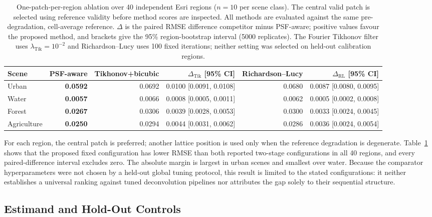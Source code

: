 \documentclass[journal]{IEEEtran}
\newcommand{\psf}{PSF\xspace}
\begin{document}
\begin{table}[t]
\centering
\caption{One-patch-per-region ablation over 40 independent Esri regions
($n=10$ per scene class). The central valid patch is selected using
reference validity before method scores are inspected. All methods are
evaluated against the same pre-degradation, cell-average reference.
$\Delta$ is the paired RMSE difference competitor minus \psf-aware;
positive values favour the proposed method, and brackets give the 95\%
region-bootstrap interval (5000 replicates). The Fourier Tikhonov filter
uses $\lambda_{\mathrm{Tik}}=10^{-2}$ and Richardson--Lucy uses 100 fixed
iterations; neither setting was selected on held-out calibration regions.}
\label{tab:rl_ablation}
\setlength{\tabcolsep}{5pt}
\begin{tabular}{lrrrrr}
\toprule
Scene & PSF-aware & Tikhonov+bicubic & $\Delta_{\mathrm{Tik}}$ [95\% CI]
& Richardson--Lucy & $\Delta_{\mathrm{RL}}$ [95\% CI] \\
\midrule
Urban       & \textbf{0.0592} & 0.0692 & 0.0100 [0.0091, 0.0108] & 0.0680 & 0.0087 [0.0080, 0.0095] \\
Water       & \textbf{0.0057} & 0.0066 & 0.0008 [0.0005, 0.0011] & 0.0062 & 0.0005 [0.0002, 0.0008] \\
Forest      & \textbf{0.0267} & 0.0306 & 0.0039 [0.0028, 0.0053] & 0.0300 & 0.0033 [0.0024, 0.0045] \\
Agriculture & \textbf{0.0250} & 0.0294 & 0.0044 [0.0031, 0.0062] & 0.0286 & 0.0036 [0.0024, 0.0054] \\
\bottomrule
\end{tabular}
\end{table}

For each region, the central patch is preferred; another lattice
position is used only when the reference degradation is degenerate.
Table~\ref{tab:rl_ablation} shows that the proposed fixed configuration has
lower RMSE than both reported two-stage configurations in all 40 regions, and
every paired-difference interval excludes zero. The absolute margin is
largest in urban scenes and smallest over water. Because the comparator
hyperparameters were not chosen by a held-out global tuning protocol, this
result is limited to the stated configurations: it neither establishes a
universal ranking against tuned deconvolution pipelines nor attributes the
gap solely to their sequential structure.

\subsection{Estimand and Hold-Out Controls}
\label{sec:auxiliary_controls}
\end{document}
